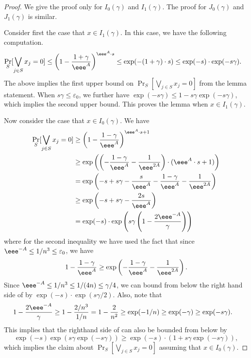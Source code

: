 \documentclass{toc}
\newcommand{\prob}[2]{\mathop{\mathrm{Pr}}_{#1}[#2]}
\begin{document}
\begin{proof}
We give the proof only for $I_0(\gamma)$ and $I_1(\gamma)$. The proof for $J_0(\gamma)$ and $J_1(\gamma)$ is similar.

Consider first the case that $x\in I_1(\gamma)$. In this case, we have the following computation. 
\begin{align}
\prob{S}{\bigvee_{j\in S} x_j = 0} &\leq \left(1-\frac{1+\gamma}{\eee^A}\right)^{\eee^A\cdot s}
%
%
\leq \exp(-(1+\gamma)\cdot s) \leq \exp(-s)\cdot \exp(-s\gamma).\label{eq:tech2}
\end{align}
The above implies the first upper bound on $\prob{S}{\bigvee_{j\in S} x_j = 0}$ from the lemma statement. When $s\gamma\leq \varepsilon_0$, we further have $\exp(-s\gamma) \leq 1-s\gamma \exp(-s\gamma)$, which implies the second upper bound. This proves the lemma when $x\in I_1(\gamma)$.

Now consider the case that $x\in I_0(\gamma)$. We have
\begin{align}
  \prob{S}{\bigvee_{j\in S}x_j = 0} &\geq \left(1-\frac{1-\gamma}{\eee^A}\right)^{\eee^A\cdot s + 1}\notag\\
                                    &\geq \exp\left(\left(-\frac{1-\gamma}{\eee^A} - \frac{1}{\eee^{2A}}\right)\cdot (\eee^A\cdot s+1)\right)\notag\\
                                    &= \exp\left(-s+s\gamma -\frac{s}{\eee^A}-\frac{1-\gamma}{\eee^A} - \frac{1}{\eee^{2A}}\right)\notag\\
                                    &\geq \exp\left(-s+s\gamma -\frac{2s}{\eee^A}\right)\notag\\
                                    &= \exp(-s)\cdot \exp\left(s\gamma\left(1-\frac{2\eee^{-A}}{\gamma}\right)\right)\label{eq:tech1}
\end{align}
where for the second inequality we have used the fact that since $\eee^{-A} \leq {1}/{n^3}\leq \varepsilon_0$, we have
\[
  1- \frac{1-\gamma}{\eee^A}\geq \exp\left(-\frac{1-\gamma}{\eee^A} - \frac{1}{\eee^{2A}}\right).
\]
Since $\eee^{-A}\leq {1}/{n^3}\leq {1}/{(4n)}\leq \gamma/4$,
we can
%
%
bound from below
%
the right hand side of  by $\exp(-s)\cdot \exp(s\gamma/2)$. Also, note that 
\begin{align*}
1-\frac{2\eee^{-A}}{\gamma} &\geq 1-\frac{2/n^3}{1/n}= 1-\frac{2}{n^2}
\geq \exp(-1/n) \geq \exp(-\gamma)\geq \exp(-s\gamma).
\end{align*}
This implies that the righthand side of  can also be bounded from below by
\[
  \exp(-s)\exp(s\gamma\exp(-s\gamma)) \geq \exp(-s)\cdot(1+s\gamma\exp(-s\gamma)),
\]
which implies the claim about $\prob{S}{\bigvee_{j\in S} x_j = 0}$
assuming that $x\in I_0(\gamma)$.
\end{proof}
\end{document}
